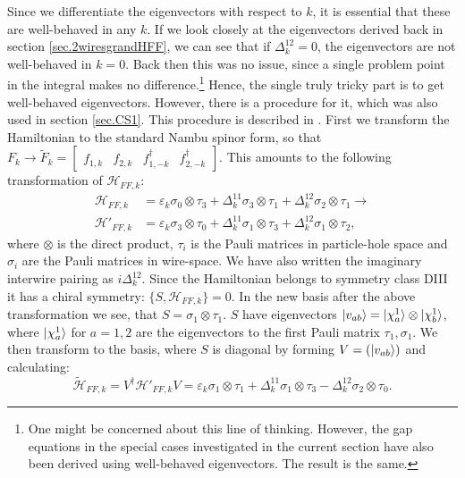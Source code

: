 Since we differentiate the eigenvectors with respect to $k$, it is essential that these are well-behaved in any $k$. If we look closely at the eigenvectors derived back in section \ref{sec.2wiresgrandHFF}, we can see that if $\Delta^{12}_k = 0$, the eigenvectors are not well-behaved in $k = 0$. Back then this was no issue, since a single problem point in the integral makes no difference.\footnote{One might be concerned about this line of thinking. However, the gap equations in the special cases investigated in the current section have also been derived using well-behaved eigenvectors. The result is the same.} Hence, the single truly tricky part is to get well-behaved eigenvectors. However, there is a procedure for it, which was also used in section \ref{sec.CS1}. This procedure is described in \cite{Ryu.Topology}. First we transform the Hamiltonian to the standard Nambu spinor form, so that $F_k \to \tilde{F}_k = \begin{bmatrix} f_{1,k} & f_{2,k} & f^\dagger_{1,-k} & f^\dagger_{2,-k}  \end{bmatrix}$. This amounts to the following transformation of $\mathcal{H}_{FF,k}$:
\begin{align}
\mathcal{H}_{FF,k} &= \varepsilon_k \sigma_0 \otimes \tau_3 + \Delta^{11}_k \sigma_3 \otimes \tau_1 + \Delta^{12}_k \sigma_2 \otimes \tau_1 \to \nonumber \\
\mathcal{H}'_{FF,k} &= \varepsilon_k \sigma_3 \otimes \tau_0 + \Delta^{11}_k \sigma_1 \otimes \tau_3 + \Delta^{12}_k \sigma_1 \otimes \tau_2, \nonumber 
\end{align}
where $\otimes$ is the direct product, $\tau_i$ is the Pauli matrices in particle-hole space and $\sigma_i$ are the Pauli matrices in wire-space. We have also written the imaginary interwire pairing as $i\Delta^{12}_k$. Since the Hamiltonian belongs to symmetry class DIII it has a chiral symmetry: $\{S, \mathcal{H}_{FF,k}\} = 0$. In the new basis after the above transformation we see, that $S = \sigma_1\otimes \tau_1$. $S$ have eigenvectors $\ket{v_{ab}} = \ket{\chi^{1}_a}\otimes \ket{\chi^{1}_b}$, where $\ket{\chi^{1}_a}$ for $a = 1,2$ are the eigenvectors to the first Pauli matrix $\tau_1, \sigma_1$. We then transform to the basis, where $S$ is diagonal by forming $V = (\ket{v_{ab}})$ and calculating:
\begin{equation}
\tilde{\mathcal{H}}_{FF,k} = V^\dagger\mathcal{H}'_{FF,k}V = \varepsilon_k \sigma_1\otimes \tau_1 + \Delta^{11}_k \sigma_1\otimes\tau_3 - \Delta^{12}_k\sigma_2\otimes\tau_0. \nonumber 
\end{equation}
